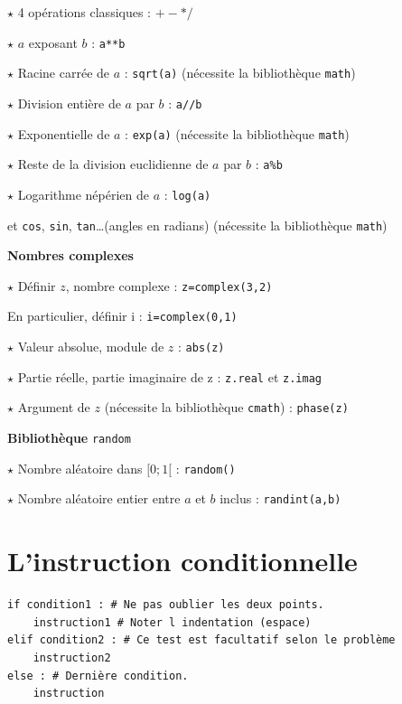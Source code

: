 $\star$ 4 opérations classiques : $+ - * /$ 

$\star$ $a$ exposant $b$ : \verb!a**b! 

$\star$ Racine carrée de $a$ : \verb!sqrt(a)! (nécessite la bibliothèque \verb~math~)

$\star$ Division entière de $a$ par $b$ : \verb!a//b !

$\star$ Exponentielle de $a$ : \verb!exp(a)! (nécessite la bibliothèque \verb~math~)

$\star$ Reste de la division euclidienne de $a$ par $b$ : \verb!a%b!

$\star$ Logarithme népérien de $a$ : \verb!log(a)!

et \verb!cos!, \verb!sin!, \verb!tan!\dots (angles en radians)
(nécessite la bibliothèque \verb~math~)

\medskip

\textbf{Nombres complexes}

$\star$ Définir $z$, nombre complexe : \verb!z=complex(3,2)!

En particulier, définir i : \verb!i=complex(0,1)!

$\star$ Valeur absolue, module de $z$ : \verb!abs(z)!

$\star$ Partie réelle, partie imaginaire de z :
\verb!z.real! et \verb!z.imag!

$\star$ Argument de $z$ (nécessite la bibliothèque \verb!cmath!) :
\verb!phase(z)!

\medskip

\textbf{Bibliothèque} \verb!random!

$\star$ Nombre aléatoire dans $[0; 1[$ : \verb!random()!

$\star$ Nombre aléatoire entier entre $a$ et $b$ inclus :
\verb!randint(a,b)!





\section{L'instruction conditionnelle}

\begin{lstlisting}
if condition1 : # Ne pas oublier les deux points.
	instruction1 # Noter l indentation (espace)
elif condition2 : # Ce test est facultatif selon le problème
	instruction2
else : # Dernière condition.
	instruction
\end{lstlisting}


